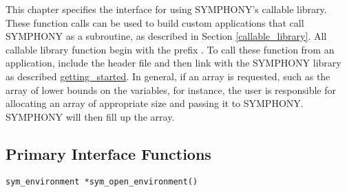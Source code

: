 
\label{C_Interface}

This chapter specifies the interface for using SYMPHONY's callable
library. These function calls can be used to build custom applications that
call SYMPHONY as a subroutine, as described in Section
\ref{callable_library}. All callable library function begin with the
prefix . To call these function from an application, include the
header file  and then link with the SYMPHONY library as
described \hyperref{here}{in Section }{}{getting_started}. In general, if an
array is requested, such as the array of lower bounds on the variables, for
instance, the user is responsible for allocating an array of appropriate size
and passing it to SYMPHONY. SYMPHONY will then fill up the array.

\newpage

\subsection{Primary Interface Functions}
\bd


\begin{verbatim}
sym_environment *sym_open_environment()
\end{verbatim}

